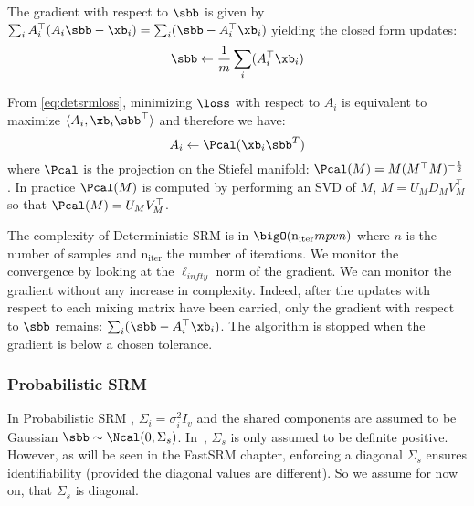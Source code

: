 The gradient with respect to $\sbb$ is given by $ \sum_i A_i^{\top}(A_i \sbb -
\xb_i) = \sum_i (\sbb -
A_i^{\top} \xb_i)$
yielding the closed form updates:
\begin{equation}
  \sbb \leftarrow  \frac1m \sum_i (A_i^{\top} \xb_i)
  \label{eq:srm:supdate}
\end{equation}

From \eqref{eq:detsrmloss}, minimizing $\loss$ with respect to $A_i$ is
equivalent to maximize $\langle A_i, \xb_i \sbb^{\top} \rangle$ and therefore we
have:
\begin{equation}
  A_i \leftarrow  \Pcal(\xb_i \sbb^T)
  \label{eq:detsrm:Aiupdate}
\end{equation}
where $\Pcal$ is the projection on the Stiefel manifold: $\Pcal(M) = M
(M^{\top}M)^{-\frac12}$. In practice $\Pcal(M)$ is computed by performing an SVD
of $M$, $M = U_M D_M V_M^{\top} $ so that $\Pcal(M) = U_M V_M^{\top}$.

The complexity of Deterministic SRM is in $\bigO(\mathrm{n_{iter}} mpvn)$ where
$n$ is the number of samples and $\mathrm{n_{iter}}$ the number of iterations.
We monitor the convergence by looking at the $\ell_{infty}$ norm of the
gradient. We can monitor the gradient without any increase in complexity.
Indeed, after the updates with respect to each mixing matrix have been
carried, only the gradient with respect to $\sbb$ remains: $\sum_i
(\sbb - A_i^{\top}\xb_i)$. The algorithm is stopped when the
gradient is below a chosen tolerance.

\subsubsection{Probabilistic SRM}
\label{sec:probabilisticsrm}
In Probabilistic SRM , $\Sigma_i=\sigma_i^2 I_v$ and the shared
components are assumed to be Gaussian $\sbb \sim \Ncal(0, \Sigma_s)$.
In~\cite{chen2015reduced}, $\Sigma_s$ is only assumed to be definite positive. However,
as will be seen in the FastSRM chapter, enforcing a diagonal $\Sigma_s$ ensures
identifiability (provided the diagonal values are different). So we assume for
now on, that $\Sigma_s$ is diagonal.

